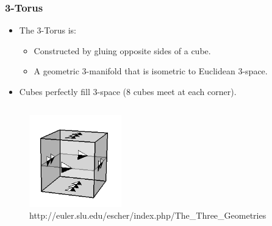 \documentclass[13pt]{beamer}
\begin{document}
\begin{frame}
\frametitle{3-Torus}
  \begin{itemize}
    \item The \alert{3-Torus} is:
          \begin{itemize}
             \item Constructed by gluing opposite sides of a cube.
             \item A geometric 3-manifold that is isometric to Euclidean 3-space.
           \end{itemize} 
    \item Cubes perfectly fill 3-space (8 cubes meet at each corner).
  \end{itemize}
  \begin{columns}[r] %
     \centering
      \begin{figure}
        \includegraphics[height=4cm]{./img/cubegluing}
        \caption{http://euler.slu.edu/escher/index.php/The\_Three\_Geometries}
      \end{figure}
  \end{columns}
\end{frame}


\end{document}
